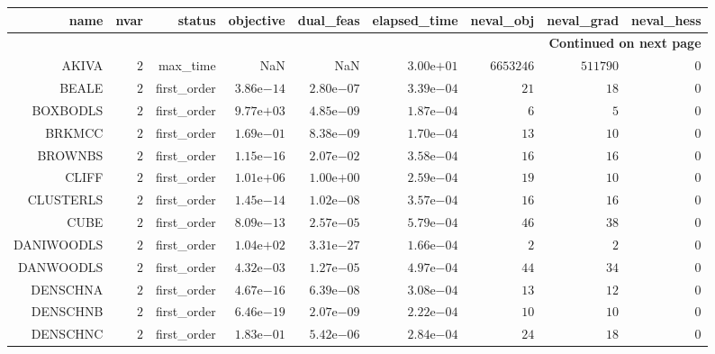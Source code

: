 \begin{longtable}{rrrrrrrrr}
\hline
name & nvar & status & objective & dual\_feas & elapsed\_time & neval\_obj & neval\_grad & neval\_hess \\\hline
\endhead
\hline
\multicolumn{9}{r}{{\bfseries Continued on next page}}\\
\hline
\endfoot
\endlastfoot
AKIVA & \(     2\) & max\_time &       NaN &       NaN & \( 3.00\)e\(+01\) & \(6653246\) & \(511790\) & \(     0\) \\
BEALE & \(     2\) & first\_order & \( 3.86\)e\(-14\) & \( 2.80\)e\(-07\) & \( 3.39\)e\(-04\) & \(    21\) & \(    18\) & \(     0\) \\
BOXBODLS & \(     2\) & first\_order & \( 9.77\)e\(+03\) & \( 4.85\)e\(-09\) & \( 1.87\)e\(-04\) & \(     6\) & \(     5\) & \(     0\) \\
BRKMCC & \(     2\) & first\_order & \( 1.69\)e\(-01\) & \( 8.38\)e\(-09\) & \( 1.70\)e\(-04\) & \(    13\) & \(    10\) & \(     0\) \\
BROWNBS & \(     2\) & first\_order & \( 1.15\)e\(-16\) & \( 2.07\)e\(-02\) & \( 3.58\)e\(-04\) & \(    16\) & \(    16\) & \(     0\) \\
CLIFF & \(     2\) & first\_order & \( 1.01\)e\(+06\) & \( 1.00\)e\(+00\) & \( 2.59\)e\(-04\) & \(    19\) & \(    10\) & \(     0\) \\
CLUSTERLS & \(     2\) & first\_order & \( 1.45\)e\(-14\) & \( 1.02\)e\(-08\) & \( 3.57\)e\(-04\) & \(    16\) & \(    16\) & \(     0\) \\
CUBE & \(     2\) & first\_order & \( 8.09\)e\(-13\) & \( 2.57\)e\(-05\) & \( 5.79\)e\(-04\) & \(    46\) & \(    38\) & \(     0\) \\
DANIWOODLS & \(     2\) & first\_order & \( 1.04\)e\(+02\) & \( 3.31\)e\(-27\) & \( 1.66\)e\(-04\) & \(     2\) & \(     2\) & \(     0\) \\
DANWOODLS & \(     2\) & first\_order & \( 4.32\)e\(-03\) & \( 1.27\)e\(-05\) & \( 4.97\)e\(-04\) & \(    44\) & \(    34\) & \(     0\) \\
DENSCHNA & \(     2\) & first\_order & \( 4.67\)e\(-16\) & \( 6.39\)e\(-08\) & \( 3.08\)e\(-04\) & \(    13\) & \(    12\) & \(     0\) \\
DENSCHNB & \(     2\) & first\_order & \( 6.46\)e\(-19\) & \( 2.07\)e\(-09\) & \( 2.22\)e\(-04\) & \(    10\) & \(    10\) & \(     0\) \\
DENSCHNC & \(     2\) & first\_order & \( 1.83\)e\(-01\) & \( 5.42\)e\(-06\) & \( 2.84\)e\(-04\) & \(    24\) & \(    18\) & \(     0\) \\

\end{longtable}
